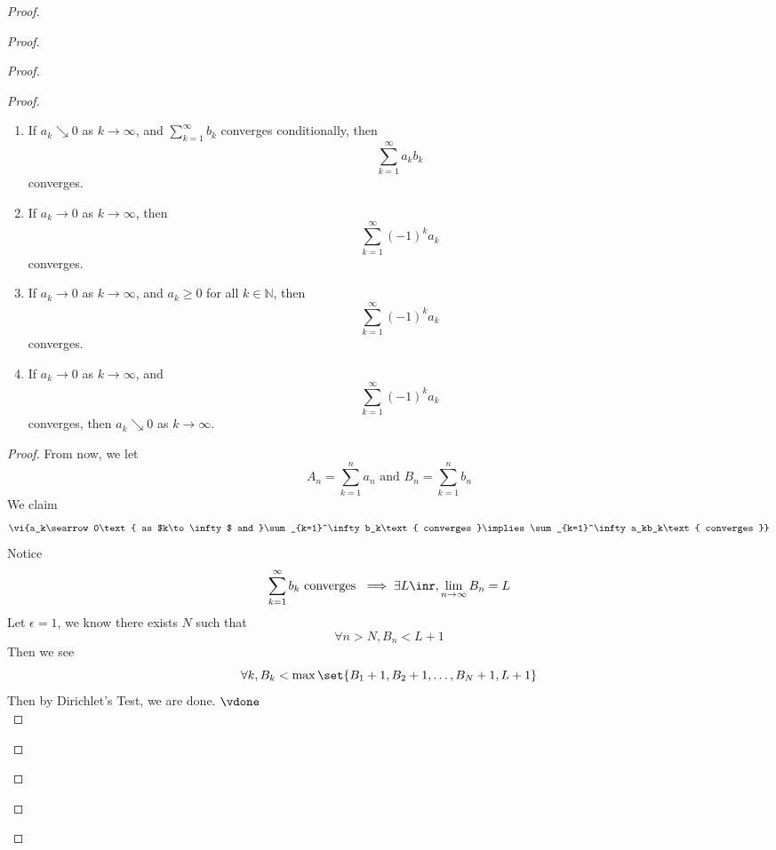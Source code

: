 \documentclass{report}
\begin{document}
\begin{proof}
\begin{proof}
\begin{proof}
\begin{proof}
\begin{question}{}{}
\begin{enumerate}
    \item If \( a_k \searrow 0 \) as \( k \to \infty \), and  $\sum_{k=1}^{\infty} b_k$ converges conditionally, then 
    \[
    \sum_{k=1}^{\infty} a_kb_k
    \]
    converges.
    
    \item If \( a_k \to 0 \) as \( k \to \infty \), then 
    \[
    \sum_{k=1}^{\infty} (-1)^k a_k
    \]
    converges.
    
    \item If \( a_k \to 0 \) as \( k \to \infty \), and \( a_k \geq 0 \) for all \( k \in \mathbb{N} \), then 
    \[
    \sum_{k=1}^{\infty} (-1)^k a_k
    \]
    converges.
    
    \item If \( a_k \to 0 \) as \( k \to \infty \), and 
    \[
    \sum_{k=1}^{\infty} (-1)^k a_k
    \]
    converges, then \( a_k \searrow 0 \) as \( k \to \infty \).
\end{enumerate}
\end{question}
\begin{proof}
From now, we let 
\begin{equation*}
A_n=\sum_{k=1}^n a_n\text{ and }B_n=\sum_{k=1}^n b_n
\end{equation*}
We claim
\begin{equation*}
  \vi{a_k\searrow 0\text{ as $k\to \infty$ and }\sum_{k=1}^\infty b_k\text{ converges }\implies \sum_{k=1}^\infty a_kb_k\text{ converges }}
\end{equation*}
Notice 
\begin{equation*}
\sum_{k=1}^\infty b_k\text{ converges }\implies \exists L\inr, \lim_{n\to\infty}B_n=L
\end{equation*}
Let $\epsilon =1$, we know there exists $N$ such that  
\begin{equation*}
\forall n>N, B_n<L+1
\end{equation*}
Then we see 
\begin{equation*}
\forall k, B_k<\max \set{B_1+1,B_2+1,\dots ,B_{N}+1,L+1}
\end{equation*}
Then by Dirichlet's Test, we are done. $\vdone$\\


\end{proof}
\end{proof}
\end{proof}
\end{proof}
\end{proof}
\end{document}
